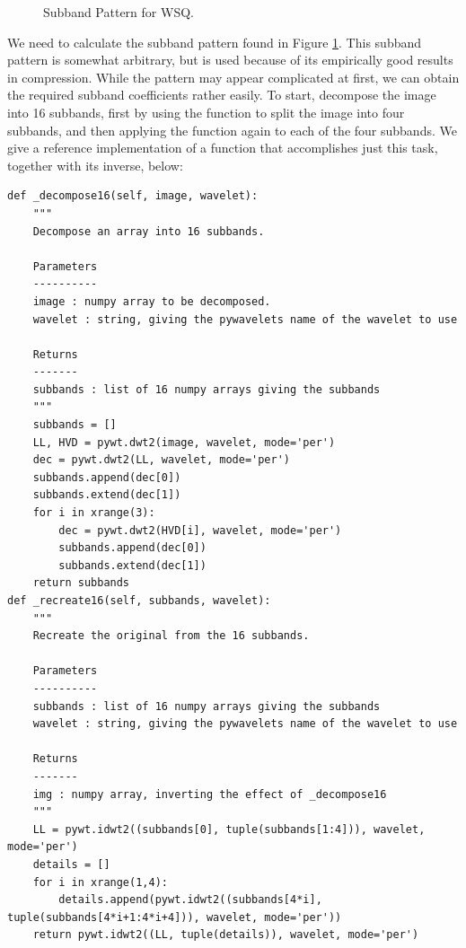 \begin{figure}
\caption{Subband Pattern for WSQ.}
\label{fig:subbands}
\end{figure}
We need to calculate the subband pattern found in Figure \ref{fig:subbands}.
This subband pattern is somewhat arbitrary, but is used because of its empirically good results in compression.
While the pattern may appear complicated at first, we can obtain the
required subband coefficients rather easily.
To start, decompose the image
into 16 subbands, first by using the  function to split the
image into four subbands, and then applying the function again to each of the
four subbands.
We give a reference implementation of a function that accomplishes just this task, together with its inverse, below:
\begin{lstlisting}
def _decompose16(self, image, wavelet):
    """
    Decompose an array into 16 subbands.

    Parameters
    ----------
    image : numpy array to be decomposed.
    wavelet : string, giving the pywavelets name of the wavelet to use

    Returns
    -------
    subbands : list of 16 numpy arrays giving the subbands
    """
    subbands = []
    LL, HVD = pywt.dwt2(image, wavelet, mode='per')
    dec = pywt.dwt2(LL, wavelet, mode='per')
    subbands.append(dec[0])
    subbands.extend(dec[1])
    for i in xrange(3):
        dec = pywt.dwt2(HVD[i], wavelet, mode='per')
        subbands.append(dec[0])
        subbands.extend(dec[1])
    return subbands
def _recreate16(self, subbands, wavelet):
    """
    Recreate the original from the 16 subbands.

    Parameters
    ----------
    subbands : list of 16 numpy arrays giving the subbands
    wavelet : string, giving the pywavelets name of the wavelet to use

    Returns
    -------
    img : numpy array, inverting the effect of _decompose16
    """
    LL = pywt.idwt2((subbands[0], tuple(subbands[1:4])), wavelet, mode='per')
    details = []
    for i in xrange(1,4):
        details.append(pywt.idwt2((subbands[4*i], tuple(subbands[4*i+1:4*i+4])), wavelet, mode='per'))
    return pywt.idwt2((LL, tuple(details)), wavelet, mode='per')
\end{lstlisting}

